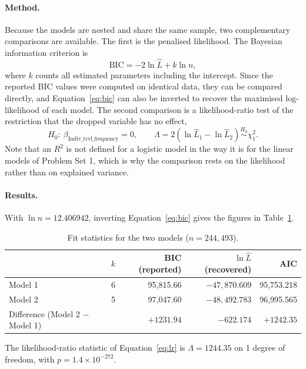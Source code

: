 \documentclass[11pt,a4paper]{article}
\begin{document}
\paragraph{Method.} Because the models are nested and share the same sample, two
complementary comparisons are available. The first is the penalised likelihood. The
Bayesian information criterion is
\begin{equation}
\mathrm{BIC} = -2\ln\hat{L} + k\ln n,
\label{eq:bic}
\end{equation}
where $k$ counts all estimated parameters including the intercept. Since the reported BIC
values were computed on identical data, they can be compared directly, and
Equation~\eqref{eq:bic} can also be inverted to recover the maximised log-likelihood of
each model. The second comparison is a likelihood-ratio test of the restriction that the
dropped variable has no effect,
\begin{equation}
H_0:\ \beta_{\text{Indiv\_trvl\_frequency}} = 0,
\qquad
\Lambda = 2\left(\ln\hat{L}_1 - \ln\hat{L}_2\right) \overset{H_0}{\sim} \chi^2_1 .
\label{eq:lr}
\end{equation}
Note that an $R^2$ is not defined for a logistic model in the way it is for the linear
models of Problem Set 1, which is why the comparison rests on the likelihood rather than
on explained variance.

\paragraph{Results.} With $\ln n = 12.406942$, inverting Equation~\eqref{eq:bic} gives the
figures in Table~\ref{tab:fit}.

\begin{table}[H]
\centering
\caption{Fit statistics for the two models ($n = 244{,}493$).}
\label{tab:fit}
\begin{tabular}{lrrrr}
\toprule
& $k$ & BIC (reported) & $\ln\hat{L}$ (recovered) & AIC \\
\midrule
Model 1 & 6 & 95{,}815.66 & $-47{,}870.609$ & 95{,}753.218 \\
Model 2 & 5 & 97{,}047.60 & $-48{,}492.783$ & 96{,}995.565 \\
\midrule
Difference (Model 2 $-$ Model 1) & & $+1231.94$ & $-622.174$ & $+1242.35$ \\
\bottomrule
\end{tabular}
\end{table}

The likelihood-ratio statistic of Equation~\eqref{eq:lr} is
$\Lambda = 1244.35$ on 1 degree of freedom, with $p = 1.4 \times 10^{-272}$.
\end{document}

